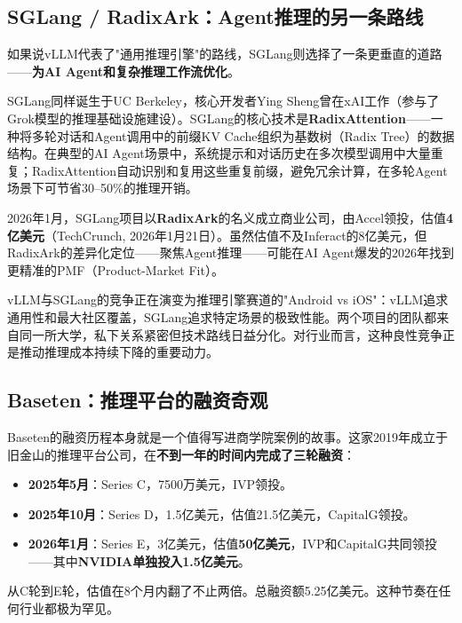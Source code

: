 \subsection{SGLang / RadixArk：Agent推理的另一条路线}
\label{subsec:sglang}

如果说vLLM代表了"通用推理引擎"的路线，SGLang则选择了一条更垂直的道路——\textbf{为AI Agent和复杂推理工作流优化}。

SGLang同样诞生于UC Berkeley，核心开发者Ying Sheng曾在xAI工作（参与了Grok模型的推理基础设施建设）。SGLang的核心技术是\textbf{RadixAttention}——一种将多轮对话和Agent调用中的前缀KV Cache组织为基数树（Radix Tree）的数据结构。在典型的AI Agent场景中，系统提示和对话历史在多次模型调用中大量重复；RadixAttention自动识别和复用这些重复前缀，避免冗余计算，在多轮Agent场景下可节省30--50\%的推理开销。

2026年1月，SGLang项目以\textbf{RadixArk}的名义成立商业公司，由Accel领投，估值\textbf{4亿美元}（TechCrunch, 2026年1月21日）。虽然估值不及Inferact的8亿美元，但RadixArk的差异化定位——聚焦Agent推理——可能在AI Agent爆发的2026年找到更精准的PMF（Product-Market Fit）。

vLLM与SGLang的竞争正在演变为推理引擎赛道的"Android vs iOS"：vLLM追求通用性和最大社区覆盖，SGLang追求特定场景的极致性能。两个项目的团队都来自同一所大学，私下关系紧密但技术路线日益分化。对行业而言，这种良性竞争正是推动推理成本持续下降的重要动力。

\subsection{Baseten：推理平台的融资奇观}
\label{subsec:baseten}

Baseten的融资历程本身就是一个值得写进商学院案例的故事。这家2019年成立于旧金山的推理平台公司，在\textbf{不到一年的时间内完成了三轮融资}：

\begin{itemize}[noitemsep]
  \item \textbf{2025年5月}：Series C，7500万美元，IVP领投。
  \item \textbf{2025年10月}：Series D，1.5亿美元，估值21.5亿美元，CapitalG领投。
  \item \textbf{2026年1月}：Series E，3亿美元，估值\textbf{50亿美元}，IVP和CapitalG共同领投——其中\textbf{NVIDIA单独投入1.5亿美元}。
\end{itemize}

从C轮到E轮，估值在8个月内翻了不止两倍。总融资额5.25亿美元。这种节奏在任何行业都极为罕见。

